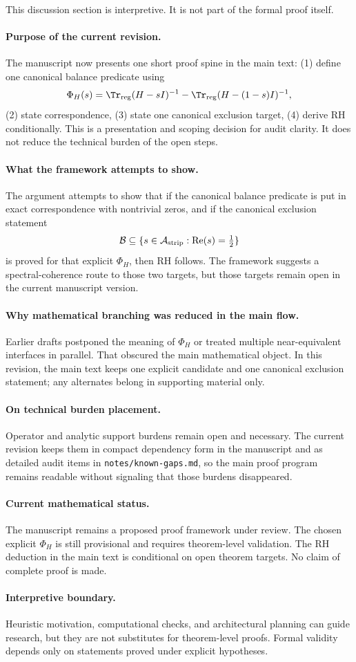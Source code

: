 This discussion section is interpretive.
It is not part of the formal proof itself.

\paragraph{Purpose of the current revision.}
The manuscript now presents one short proof spine in the main text:
(1) define one canonical balance predicate using
\[
\Phi_H(s)=\Tr_{\mathrm{reg}}(H-sI)^{-1}-\Tr_{\mathrm{reg}}(H-(1-s)I)^{-1},
\]
(2) state correspondence,
(3) state one canonical exclusion target,
(4) derive RH conditionally.
This is a presentation and scoping decision for audit clarity.
It does not reduce the technical burden of the open steps.

\paragraph{What the framework attempts to show.}
The argument attempts to show that if the canonical balance predicate is put in exact correspondence with nontrivial zeros, and if the canonical exclusion statement
\[
\mathcal{B}\subseteq\{s\in\mathcal{A}_{\mathrm{strip}}:\operatorname{Re}(s)=\tfrac12\}
\]
is proved for that explicit $\Phi_H$, then RH follows.
The framework suggests a spectral-coherence route to those two targets, but those targets remain open in the current manuscript version.

\paragraph{Why mathematical branching was reduced in the main flow.}
Earlier drafts postponed the meaning of $\Phi_H$ or treated multiple near-equivalent interfaces in parallel.
That obscured the main mathematical object.
In this revision, the main text keeps one explicit candidate and one canonical exclusion statement; any alternates belong in supporting material only.

\paragraph{On technical burden placement.}
Operator and analytic support burdens remain open and necessary.
The current revision keeps them in compact dependency form in the manuscript and as detailed audit items in \texttt{notes/known-gaps.md}, so the main proof program remains readable without signaling that those burdens disappeared.

\paragraph{Current mathematical status.}
The manuscript remains a proposed proof framework under review.
The chosen explicit $\Phi_H$ is still provisional and requires theorem-level validation.
The RH deduction in the main text is conditional on open theorem targets.
No claim of complete proof is made.

\paragraph{Interpretive boundary.}
Heuristic motivation, computational checks, and architectural planning can guide research, but they are not substitutes for theorem-level proofs.
Formal validity depends only on statements proved under explicit hypotheses.
